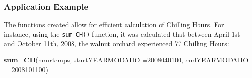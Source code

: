 \documentclass[
]{article}
\newenvironment{Shaded}{\begin{snugshade}}{\end{snugshade}}
\newcommand{\AttributeTok}[1]{\textcolor[rgb]{0.13,0.29,0.53}{#1}}
\newcommand{\DecValTok}[1]{\textcolor[rgb]{0.00,0.00,0.81}{#1}}
\newcommand{\FunctionTok}[1]{\textcolor[rgb]{0.13,0.29,0.53}{\textbf{#1}}}
\newcommand{\NormalTok}[1]{#1}
\newcommand{\OtherTok}[1]{\textcolor[rgb]{0.56,0.35,0.01}{#1}}
\newcommand{\SpecialCharTok}[1]{\textcolor[rgb]{0.81,0.36,0.00}{\textbf{#1}}}
\begin{document}
\begin{Shaded}
\end{Shaded}

\subsubsection{Application Example}\label{application-example}

The functions created allow for efficient calculation of Chilling Hours. For instance, using the \texttt{sum\_CH()} function, it was calculated that between April 1st and October 11th, 2008, the walnut orchard experienced 77 Chilling Hours:

\begin{Shaded}
\begin{Highlighting}[]
\FunctionTok{sum\_CH}\NormalTok{(hourtemps, }\AttributeTok{startYEARMODAHO =}\DecValTok{2008040100}\NormalTok{,}
                  \AttributeTok{endYEARMODAHO =} \DecValTok{2008101100}\NormalTok{)}
\end{Highlighting}
\end{Shaded}
\end{document}

